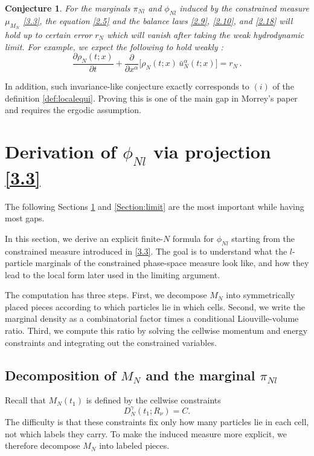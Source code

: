 \documentclass[11pt]{article}
\newtheorem{conjecture}{Conjecture}
\begin{document}
\begin{conjecture}\label{conj:pi}
    For the marginals $\pi_{Nl}$ and $\phi_{Nl}$ induced by the constrained measure $\mu_{M_N}$ \eqref{3.3}, the equation \eqref{2.5} and the balance laws \eqref{2.9}, \eqref{2.10}, and \eqref{2.18} will hold up to certain error $r_N$ which will vanish after taking the weak hydrodynamic limit. For example, we expect the following to hold weakly :\[\frac{\partial\rho_N(t;x)}{\partial t}+\frac{\partial}{\partial x^\alpha}\!\big[\rho_N(t;x)\,\bar{u}_N^\alpha(t;x)\big]=r_N\,.\]
\end{conjecture}

In addition, such invariance-like conjecture exactly corresponds to $(i)$ of the definition \ref{def:localequi}. Proving this is one of the main gap in Morrey's paper and requires the ergodic assumption.


\section{Derivation of $\phi_{Nl}$ via projection \eqref{3.3}}
\label{Section:phiNL}
The following Sections \ref{Section:phiNL} and \ref{Section:limit} are the most important while having most gaps. 

In this section, we derive an explicit finite-$N$ formula for $\phi_{Nl}$ starting from the constrained measure introduced in \eqref{3.3}. The goal is to understand what the $l$-particle marginals of the constrained phase-space measure look like, and how they lead to the local form later used in the limiting argument. 

The computation has three steps. First, we decompose $M_N$ into symmetrically placed pieces according to which particles lie in which cells. Second, we write the marginal density as a combinatorial factor times a conditional Liouville-volume ratio. Third, we compute this ratio by solving the cellwise momentum and energy constraints and integrating out the constrained variables.

\subsection{Decomposition of $M_N$ and the marginal $\pi_{Nl}$}

Recall that $M_N(t_1)$ is defined by the cellwise constraints
\[
D_N^\gamma(t_1;R_\nu)=C.
\]
The difficulty is that these constraints fix only how many particles lie in each cell, not which labels they carry. To make the induced measure more explicit, we therefore decompose $M_N$ into labeled pieces.
\end{document}
